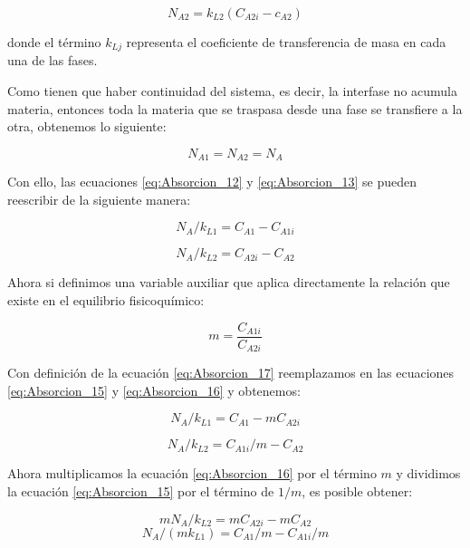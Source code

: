 \documentclass[11pt]{book}
\begin{document}
\begin{equation}
    \label{eq:Absorcion_13}
    N_{A2} = k_{L2} (C_{A2i} - c_{A2})
\end{equation}

donde el término $k_{Lj}$ representa el coeficiente de transferencia de masa en cada una de las fases.

Como tienen que haber continuidad del sistema, es decir, la interfase no acumula materia, entonces toda la materia que se traspasa desde una fase se transfiere a la otra, obtenemos lo siguiente:

\begin{equation}
    \label{eq:Absorcion_14}
    N_{A1} = N_{A2} = N_A
\end{equation}

Con ello, las ecuaciones \ref{eq:Absorcion_12} y \ref{eq:Absorcion_13} se pueden reescribir de la siguiente manera:

\begin{equation}
    \label{eq:Absorcion_15}
    N_A/k_{L1} = C_{A1} - C_{A1i}
\end{equation}

\begin{equation}
    \label{eq:Absorcion_16}
    N_A/k_{L2} = C_{A2i} - C_{A2}
\end{equation}

Ahora si definimos una variable auxiliar que aplica directamente la relación que existe en el equilibrio fisicoquímico:

\begin{equation}
    \label{eq:Absorcion_17}
    m = \frac{C_{A1i}}{C_{A2i}}
\end{equation}

Con definición de la ecuación \ref{eq:Absorcion_17} reemplazamos en las ecuaciones \ref{eq:Absorcion_15} y \ref{eq:Absorcion_16} y obtenemos:

\begin{equation}
    \label{eq:Absorcion_18}
    N_A/k_{L1} = C_{A1} - m C_{A2i}
\end{equation}

\begin{equation}
    \label{eq:Absorcion_19}
    N_A/k_{L2} = C_{A1i}/m - C_{A2}
\end{equation}

Ahora multiplicamos la ecuación \ref{eq:Absorcion_16} por el término $m$ y dividimos la ecuación \ref{eq:Absorcion_15} por el término de $1/m$, es posible obtener:

\begin{equation}
    \label{eq:Absorcion_20}
    mN_A/k_{L2} = mC_{A2i} - mC_{A2}
\end{equation}
\begin{equation}
    \label{eq:Absorcion_21}
     N_A/(m k_{L1}) = C_{A1}/m - C_{A1i}/m
\end{equation}
\end{document}
